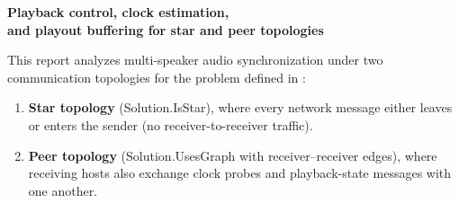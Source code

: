 \documentclass[11pt,a4paper]{article}
\DeclareRobustCommand{\lean}[1]{{\ttfamily\def\_{\textunderscore\allowbreak}#1}}
\theoremstyle{definition}
\begin{document}
\begin{center}
{\LARGE\bfseries Playback control, clock estimation,\\[2pt]
and playout buffering for star and peer topologies\par}
\end{center}
\medskip

This report analyzes multi-speaker audio synchronization under two
communication topologies for the problem defined in :
\begin{enumerate}
\item \textbf{Star topology} (\lean{Solution.IsStar}), where every network
  message either leaves or enters the sender (no receiver-to-receiver traffic).
\item \textbf{Peer topology} (\lean{Solution.UsesGraph} with
  receiver--receiver edges), where receiving hosts also exchange clock probes
  and playback-state messages with one another.
\end{enumerate}
\end{document}
